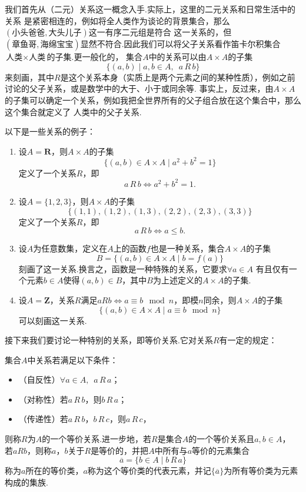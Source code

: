 我们首先从（二元）关系这一概念入手.实际上，这里的二元关系和日常生活中的关系
是紧密相连的，例如将全人类作为谈论的背景集合，那么$(\text{小头爸爸}, \text{大头儿子})$这一有序二元组是符合
这一关系的，但$(\text{章鱼哥}, \text{海绵宝宝})$显然不符合.因此我们可以将父子关系看作笛卡尔积集合$\text{人类}\times\text{人类}$的子集.更一般化的，
集合$A$中的关系可以由$A\times A$的子集
\[\{(a,b) \mid a,b\in A, \enspace a\,R\,b\}\]
来刻画，其中$R$是这个关系本身（实质上是两个元素之间的某种性质），例如之前讨论的父子关系，或是数学中的大于、小于或同余等.
事实上，反过来，由$A\times A$的子集可以确定一个关系，例如我把全世界所有的父子组合放在这个集合中，那么这个集合就定义了
人类中的父子关系.
\begin{example}
    以下是一些关系的例子：
    \begin{enumerate}[label=(\arabic*)]
        \item 设$A=\mathbf{R}$，则$A\times A$的子集
        \[\{(a,b)\in A\times A \mid a^2+b^2=1\}\]
        定义了一个关系$R$，即
        \[a\,R\,b \iff a^2+b^2=1.\]
        \item 设$A=\{1,2,3\}$，则$A\times A$的子集
        \[\{(1,1),(1,2),(1,3),(2,2),(2,3),(3,3)\}\]
        定义了一个关系$R$，即
        \[a\,R\,b \iff a\leqslant b.\]
        \item 设$A$为任意数集，定义在$A$上的函数$f$也是一种关系，集合$A\times A$的子集
        \[B=\{(a,b)\in A\times A \mid b=f(a)\}\]
        刻画了这一关系.换言之，函数是一种特殊的关系，它要求$\forall a\in A$
        有且仅有一个元素$b\in A$使得$(a,b)\in B$，其中$B$为上述定义的$A\times A$的子集.
        \item 设$A=\mathbf{Z}$，关系$R$满足$aRb\iff a\equiv b \mod n$，即模$n$同余，则$A\times A$的子集
        \[\{(a,b)\in A\times A \mid a\equiv b \mod n\}\]
        可以刻画这一关系.
    \end{enumerate}
\end{example}

接下来我们要讨论一种特别的关系，即等价关系.它对关系$R$有一定的规定：
\begin{definition}
    集合$A$中关系若满足以下条件：
    \begin{itemize}
        \item（自反性）$\forall a\in A, \enspace a\,R\,a$；

        \item（对称性）若$a\,R\,b$，则$b\,R\,a$；

        \item（传递性）若$a\,R\,b$，$b\,R\,c$，则$a\,R\,c$，
    \end{itemize}
    则称$R$为$A$的一个等价关系.进一步地，若$R$是集合$A$的一个等价关系且$a,b\in A$，
    若$aRb$，则称$a$，$b$关于$R$是等价的，并把$A$中所有与$a$等价的元素集合
    \[\overline{a}=\{b\in A \mid b\,R\,a\}\]
    称为$a$所在的等价类，$a$称为这个等价类的代表元素，并记$\{\overline{a}\}$为所有等价类为元素构成的集族.
\end{definition}

